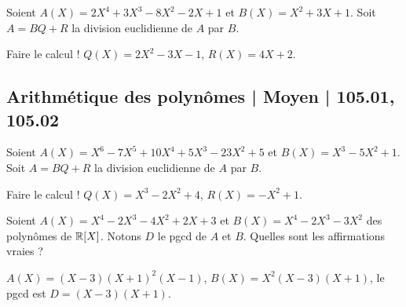 \begin{question}
Soient $A(X) = 2 X^4 + 3 X^3 - 8 X^2 - 2 X + 1$ et $B(X) = X^2+3X+1$. Soit $A = BQ+R$ la division euclidienne de $A$ par $B$.
\begin{answers}



\end{answers}
\begin{explanations}
Faire le calcul !
$Q(X) = 2X^2-3X-1$, $R(X) = 4X+2$.
\end{explanations}
\end{question}




\subsection{Arithmétique des polynômes | Moyen | 105.01, 105.02}

\begin{question}
Soient $A(X) = X^6 - 7 X^5 + 10 X^4 + 5 X^3 - 23 X^2 + 5$ et $B(X) = X^3-5X^2+1$. Soit $A = BQ+R$ la division euclidienne de $A$ par $B$.
\begin{answers}



\end{answers}
\begin{explanations}
Faire le calcul !
$Q(X) = X^3-2X^2+4$, $R(X) = -X^2+1$.
\end{explanations}
\end{question}

\begin{question}

Soient $A(X) = X^4 - 2 X^3 - 4 X^2 + 2 X + 3$ et 
$B(X) = X^4 - 2 X^3 - 3 X^2$ des polynômes de $\mathbb{R}[X]$.
Notons $D$ le pgcd de $A$ et $B$.
Quelles sont les affirmations vraies  ?
\begin{answers}



\end{answers}
\begin{explanations}
$A(X) = (X-3)(X+1)^2(X-1)$, $B(X) = X^2(X-3)(X+1)$,
le pgcd est $D = (X-3)(X+1)$. 
\end{explanations}
\end{question}


